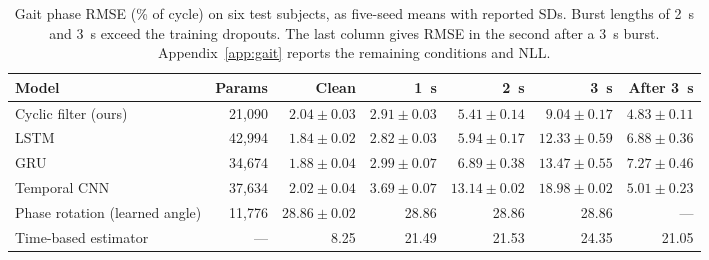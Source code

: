 \begin{table}[!t]
\centering\small
\caption{Gait phase RMSE (\% of cycle) on six test subjects, as five-seed
means with reported SDs. Burst lengths of 2~s and 3~s exceed the
training dropouts. The last column gives RMSE in the second after a 3~s burst.
Appendix~\ref{app:gait} reports the remaining conditions and NLL.}
\label{tab:gait}
\setlength{\tabcolsep}{3pt}
\begin{tabular}{@{}lrrrrrr@{}}
\toprule
Model & Params & Clean & 1~s & 2~s & 3~s & After 3~s \\
\midrule
Cyclic filter (ours) & 21,090 & $2.04\pm0.03$ & $2.91\pm0.03$ & $\mathbf{5.41}\pm0.14$ & $\mathbf{9.04}\pm0.17$ & $\mathbf{4.83}\pm0.11$ \\
LSTM & 42,994 & $1.84\pm0.02$ & $2.82\pm0.03$ & $5.94\pm0.17$ & $12.33\pm0.59$ & $6.88\pm0.36$ \\
GRU & 34,674 & $1.88\pm0.04$ & $2.99\pm0.07$ & $6.89\pm0.38$ & $13.47\pm0.55$ & $7.27\pm0.46$ \\
Temporal CNN & 37,634 & $2.02\pm0.04$ & $3.69\pm0.07$ & $13.14\pm0.02$ & $18.98\pm0.02$ & $5.01\pm0.23$ \\
Phase rotation (learned angle) & 11,776 & $28.86\pm0.02$ & 28.86 & 28.86 & 28.86 & --- \\
Time-based estimator & --- & 8.25 & 21.49 & 21.53 & 24.35 & 21.05 \\
\bottomrule
\end{tabular}
\end{table}
